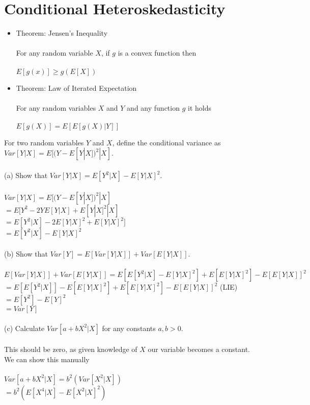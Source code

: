 \documentclass{article}
\begin{document}
\section{Conditional Heteroskedasticity}
\begin{itemize}
    \item Theorem: Jensen's Inequality\\\\
    For any random variable $X$, if $g$ is a convex function then\\\\
    $E[g(x)]\geq g(E[X])$
    \item Theorem: Law of Iterated Expectation\\\\
    For any random variables $X$ and $Y$ and any function $g$ it holds\\\\
    $E[g(X)]=E[E[g(X)|Y]]$
\end{itemize}
For two random variables $Y$ and $X$, define the conditional variance as $Var[Y|X]=E[(Y-E[Y|X])^2|X]$.\\\\
(a) Show that $Var[Y|X]=E[Y^2|X]-E[Y|X]^2$.\\\\
$Var[Y|X]=E[(Y-E[Y|X])^2|X]$\\
$=E[Y^2-2YE[Y|X]+E[Y|X]^2|X]$\\
$=E[Y^2|X]-2E[Y|X]^2+E[Y|X]^2]$\\
$=E[Y^2|X]-E[Y|X]^2$\\\\
(b) Show that $Var[Y]=E[Var[Y|X]]+Var[E[Y|X]]$.\\\\
$E[Var[Y|X]]+Var[E[Y|X]]=E[E[Y^2|X]-E[Y|X]^2]+E[E[Y|X]^2]-E[E[Y|X]]^2$\\
$=E[E[Y^2|X]]-E[E[Y|X]^2]+E[E[Y|X]^2]-E[E[Y|X]]^2$ (LIE)\\
$=E[Y^2]-E[Y]^2$\\
$=Var[Y]$\\\\
(c) Calculate $Var[a+bX^2|X]$ for any constants $a,b>0$.\\\\
This should be zero, as given knowledge of $X$ our variable becomes a constant.  We can show this manually\\\\
$Var[a+bX^2|X]=b^2(Var[X^2|X])$\\
$=b^2(E[X^4|X]-E[X^2|X]^2)$\\
\end{document}
